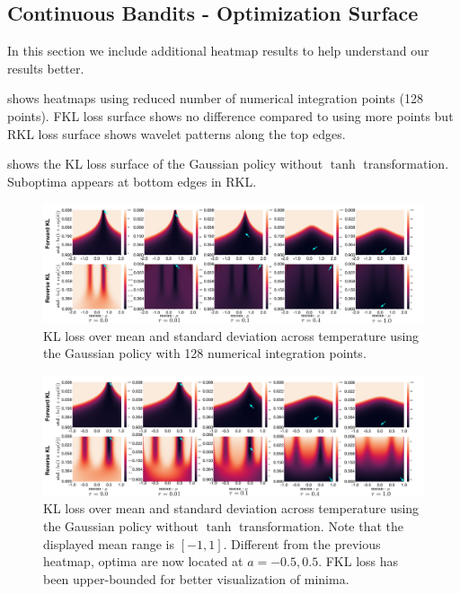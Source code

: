 \documentclass{article}
\begin{document}
\subsection{Continuous Bandits - Optimization Surface}\label{sec:bandit-plots}
In this section we include additional heatmap results to help understand our results better.

 shows heatmaps using reduced number of numerical integration points (128 points). FKL loss surface shows no difference compared to using more points but RKL loss surface shows wavelet patterns along the top edges.

 shows the KL loss surface of the Gaussian policy without $\tanh$ transformation. Suboptima appears at bottom edges in RKL. 


\begin{figure}
    \centering
    \includegraphics[width=0.99\columnwidth]{figs/bandit/trueQ/heatmaps/heatmap_combined_reduced_pts.pdf}
    \caption{KL loss over mean and standard deviation across temperature using the Gaussian policy with 128 numerical integration points. }
    \label{fig:bandit-heatmap-reduced-pts}
\end{figure}

\begin{figure}
    \centering
    \includegraphics[width=0.99\columnwidth]{figs/bandit/trueQ/heatmaps/heatmap_non_tanh_combined.pdf}
    \caption{KL loss over mean and standard deviation across temperature using the Gaussian policy without $\tanh$ transformation. Note that the displayed mean range is $[-1,1]$. Different from the previous heatmap, optima are now located at $a=-0.5, 0.5$.  FKL loss has been upper-bounded for better visualization of minima.}
    \label{fig:bandit-heatmap-non-tanh}
\end{figure}
\end{document}
